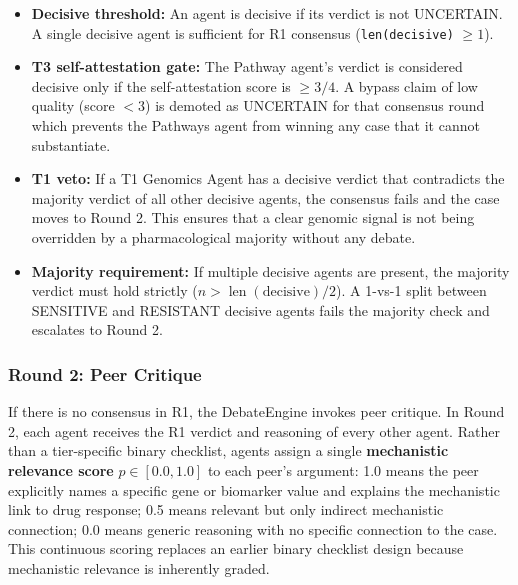 \documentclass{article}
\begin{document}
\begin{itemize}[leftmargin=*]
    \item \textbf{Decisive threshold:} An agent is decisive if its verdict is not UNCERTAIN. A single decisive agent is sufficient for R1 consensus (\texttt{len(decisive)} $\geq 1$).

    \item \textbf{T3 self-attestation gate:} The Pathway agent's verdict is considered decisive only if the self-attestation score is $\geq 3/4$. A bypass claim of low quality (score $<3$) is demoted as UNCERTAIN for that consensus round which prevents the Pathways agent from winning any case that it cannot substantiate. 

    \item \textbf{T1 veto:} If a T1 Genomics Agent has a decisive verdict that contradicts the majority verdict of all other decisive agents, the consensus fails and the case moves to Round 2. This ensures that a clear genomic signal is not being overridden by a pharmacological majority without any debate.

    \item \textbf{Majority requirement:} If multiple decisive agents are present, the majority verdict must hold strictly ($n > \operatorname{len}(\mathrm{decisive})/2$). A 1-vs-1 split between SENSITIVE and RESISTANT decisive agents fails the majority check and escalates to Round 2.
\end{itemize}


\subsubsection{Round 2: Peer Critique}
If there is no consensus in R1, the DebateEngine invokes peer critique. In Round 2, each agent receives the R1 verdict and reasoning of every other agent. Rather than a tier-specific binary checklist, agents assign a single \textbf{mechanistic relevance score} $p \in [0.0, 1.0]$ to each peer's argument: 1.0 means the peer explicitly names a specific gene or biomarker value and explains the mechanistic link to drug response; 0.5 means relevant but only indirect mechanistic connection; 0.0 means generic reasoning with no specific connection to the case. This continuous scoring replaces an earlier binary checklist design because mechanistic relevance is inherently graded.
\end{document}
